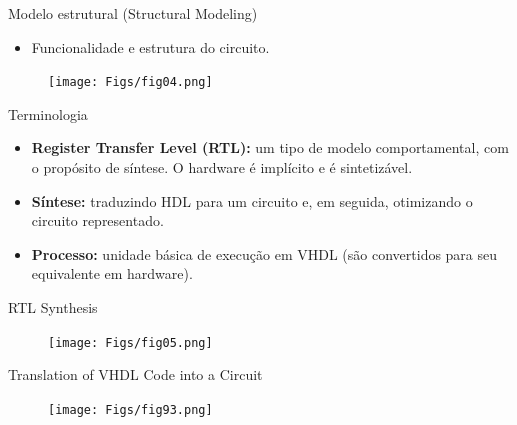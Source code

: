 \documentclass[aspectratio=169]{beamer}
\begin{document}
\begin{frame}{Modelo estrutural (Structural Modeling)}
	\justifying
	
	\begin{itemize}
		\justifying
		\item Funcionalidade e estrutura do circuito.
	\end{itemize}
	
	
	\begin{figure}[h]
		\centering
		\texttt{[image: Figs/fig04.png]}
	\end{figure}
	
	
\end{frame}
\begin{frame}{Terminologia}
	\justifying
	
	\begin{itemize}
		\justifying
		\item \textbf{Register Transfer Level (RTL):} um tipo de modelo comportamental, com o propósito de síntese. O hardware é implícito e é sintetizável.
		
		\item \textbf{Síntese:} traduzindo HDL para um circuito e, em seguida, otimizando o circuito representado.
		
		\item \textbf{Processo:} unidade básica de execução em VHDL (são convertidos para seu equivalente em hardware).
		
		
	\end{itemize}
	
	
\end{frame}
\begin{frame}{RTL Synthesis}
	\justifying
	
	
	\begin{figure}[h]
		\centering
		\texttt{[image: Figs/fig05.png]}
	\end{figure}
	
	
\end{frame}
\begin{frame}{Translation of VHDL Code into a Circuit}
	\justifying
	
	
	\begin{figure}[h]
		\centering
		\texttt{[image: Figs/fig93.png]}
	\end{figure}
	
	
\end{frame}
\end{document}

